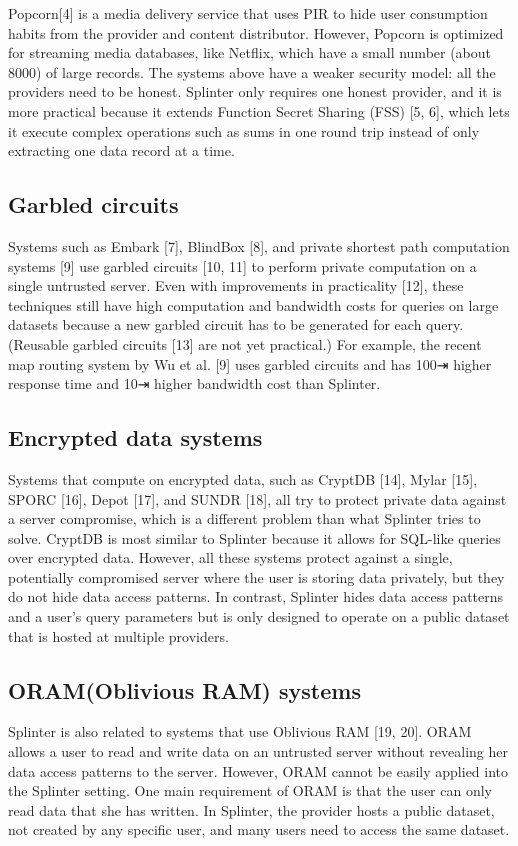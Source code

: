 \documentclass[12pt,a4paper]{article}
\begin{document}
\begin{multicols}{2}
Popcorn[4] is a media delivery service that uses 
PIR to hide user consumption habits from the 
provider and content distributor. However, Popcorn 
is optimized for streaming media databases, like 
Netflix, which have a small number (about 8000) of 
large records.
The systems above have a weaker security model: all
the providers need to be honest. Splinter only 
requires one honest provider, and it is more 
practical because it extends Function Secret 
Sharing (FSS) [5, 6], which lets it execute 
complex operations such as sums in one round trip 
instead of only extracting one data record at a 
time.
\subsection{Garbled circuits}
Systems such as Embark [7], BlindBox [8], and 
private shortest path computation systems [9] 
use garbled circuits [10, 11] to perform private 
computation on a single untrusted server. Even with 
improvements in practicality [12], these techniques 
still have high computation and bandwidth costs for 
queries on large datasets because a new garbled 
circuit has to be generated for each query. 
(Reusable garbled circuits [13] are not yet 
practical.) For example, the recent map routing 
system by Wu et al. [9] uses garbled circuits and 
has 100⇥ higher response time and 10⇥ higher
bandwidth cost than Splinter.
\subsection{Encrypted data systems}
Systems that compute on encrypted data, such as CryptDB [14], Mylar [15], SPORC [16], Depot [17], and SUNDR [18], all try to protect private data against a server compromise, which is a different problem than what Splinter tries to solve. CryptDB is most similar to Splinter because it allows for SQL-like queries over encrypted data. However, all these systems protect against a single, potentially compromised server where the user is storing data privately, but they do not hide data access patterns. In contrast, Splinter hides data access patterns and a user’s query parameters but is only designed to operate on a public dataset that is hosted at multiple providers.
\subsection{ORAM(Oblivious RAM) systems}
Splinter is also related to systems that use Oblivious RAM [19, 20]. ORAM allows a user to read and write data on an untrusted server without revealing her data access patterns to the server. However, ORAM cannot be easily applied into the Splinter setting. One main requirement of ORAM is that the user can only read data that she has written. In Splinter, the provider hosts a public dataset, not created by any specific user, and many users need to access the same dataset.

\end{multicols}
\end{document}
